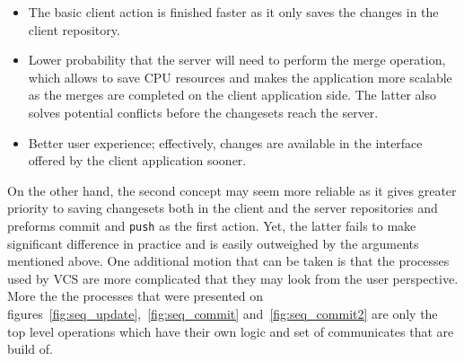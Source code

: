 \begin{itemize}
\item{The basic client action is finished faster as it only saves the changes in the client repository.}
\item{Lower probability that the server will need to perform the merge operation, which allows to save CPU resources and makes the application more scalable as the merges are completed on the client application side. The latter also solves potential conflicts before the changesets reach the server.}
\item{Better user experience; effectively, changes are available in the interface offered by the client application sooner.}
\end{itemize}
On the other hand, the second concept may seem more reliable as it gives greater priority to saving changesets both in the client and the server repositories and preforms commit and \texttt{push} as the first action. Yet, the latter fails to make significant difference in practice and is easily outweighed by the arguments mentioned above. One additional motion that can be taken is that the processes used by VCS are more complicated that they may look from the user perspective. More the the processes that were presented on figures~\ref{fig:seq_update},~\ref{fig:seq_commit} and~\ref{fig:seq_commit2} are only the top level operations which have their own logic and set of communicates that are build of.

